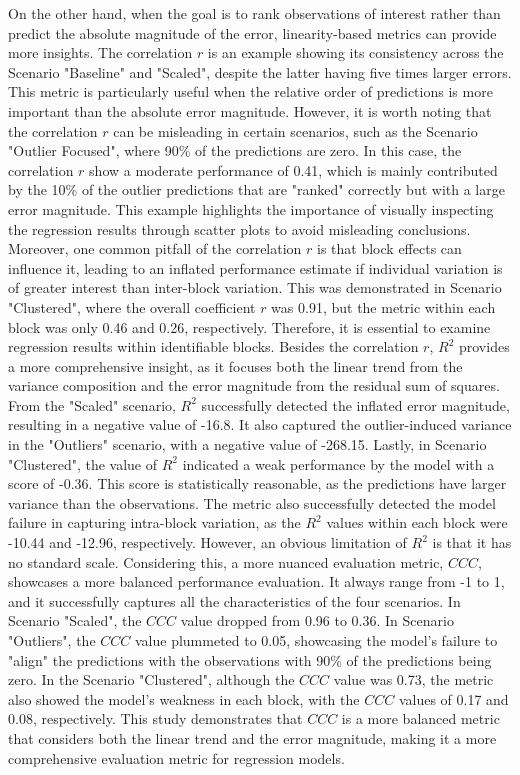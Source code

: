 On the other hand, when the goal is to rank observations of interest rather than predict the absolute magnitude of the error, linearity-based metrics can provide more insights. The correlation $r$ is an example showing its consistency across the Scenario "Baseline" and "Scaled", despite the latter having five times larger errors. This metric is particularly useful when the relative order of predictions is more important than the absolute error magnitude. However, it is worth noting that the correlation $r$ can be misleading in certain scenarios, such as the Scenario "Outlier Focused", where 90\% of the predictions are zero. In this case, the correlation $r$ show a moderate performance of 0.41, which is mainly contributed by the 10\% of the outlier predictions that are "ranked" correctly but with a large error magnitude. This example highlights the importance of visually inspecting the regression results through scatter plots to avoid misleading conclusions. Moreover, one common pitfall of the correlation $r$ is that block effects can influence it, leading to an inflated performance estimate if individual variation is of greater interest than inter-block variation. This was demonstrated in Scenario "Clustered", where the overall coefficient $r$ was 0.91, but the metric within each block was only 0.46 and 0.26, respectively. Therefore, it is essential to examine regression results within identifiable blocks. Besides the correlation $r$, $R^2$ provides a more comprehensive insight, as it focuses both the linear trend from the variance composition and the error magnitude from the residual sum of squares. From the "Scaled" scenario, $R^2$ successfully detected the inflated error magnitude, resulting in a negative value of -16.8. It also captured the outlier-induced variance in the "Outliers" scenario, with a negative value of -268.15. Lastly, in Scenario "Clustered", the value of $R^2$ indicated a weak performance by the model with a score of -0.36. This score is statistically reasonable, as the predictions have larger variance than the observations. The metric also successfully detected the model failure in capturing intra-block variation, as the $R^2$ values within each block were -10.44 and -12.96, respectively. However, an obvious limitation of $R^2$ is that it has no standard scale. Considering this, a more nuanced evaluation metric, $CCC$, showcases a more balanced performance evaluation. It always range from -1 to 1, and it successfully captures all the characteristics of the four scenarios. In Scenario "Scaled", the $CCC$ value dropped from 0.96 to 0.36. In Scenario "Outliers", the $CCC$ value plummeted to 0.05, showcasing the model's failure to "align" the predictions with the observations with 90\% of the predictions being zero. In the Scenario "Clustered", although the $CCC$ value was 0.73, the metric also showed the model's weakness in each block, with the $CCC$ values of 0.17 and 0.08, respectively. This study demonstrates that $CCC$ is a more balanced metric that considers both the linear trend and the error magnitude, making it a more comprehensive evaluation metric for regression models.

